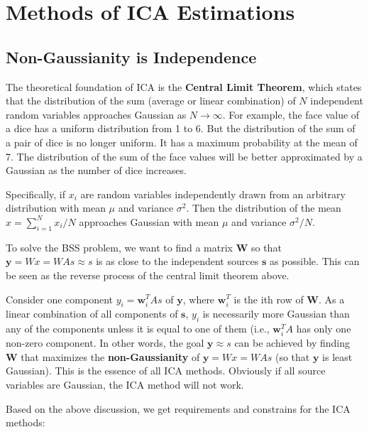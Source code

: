 \documentclass[12pt, a4paper, onecolumn]{IEEEtran}
\begin{document}
\section{Methods of ICA Estimations}

\subsection*{Non-Gaussianity is Independence}

The theoretical foundation of ICA is the
\textbf{Central Limit Theorem},
which states that the distribution of the sum (average or linear
combination) of $N$ independent random variables approaches Gaussian
as $N\rightarrow \infty$. For example, the face value of a dice has a
uniform distribution from 1 to 6. But the distribution of the sum of a
pair of dice is no longer uniform. It has a maximum probability at the
mean of 7. The distribution of the sum of the face values will be better
approximated by a Gaussian as the number of dice increases.

Specifically, if $x_i$ are random variables independently drawn from an
arbitrary distribution with mean $\mu$ and variance $\sigma^2$. Then the
distribution of the mean $x=\sum_{i=1}^N x_i/N$ approaches Gaussian with
mean $\mu$ and variance $\sigma^2/N$.

To solve the BSS problem, we want to find a matrix ${\mathbf W}$ so that
${\mathbf y=Wx=WAs \approx s}$ is as close to the independent sources
${\mathbf s}$ as possible. This can be seen as the reverse process of the
central limit theorem above.

Consider one component $y_i={\mathbf w_i^TAs}$ of ${\mathbf y}$, where
${\mathbf w_i^T}$ is the ith row of ${\mathbf W}$. As a linear combination
of all components of ${\mathbf s}$, $y_i$ is necessarily more Gaussian
than any of the components unless it is equal to one of them (i.e.,
${\mathbf w_i^TA}$ has only one non-zero component.
In other words, the goal ${\mathbf y \approx s}$ can be achieved by finding
${\mathbf W}$ that maximizes the {\bf non-Gaussianity} of
${\mathbf y=Wx=WAs}$ (so that ${\mathbf y}$ is least Gaussian). This is
the essence of all ICA methods. Obviously if all source variables are
Gaussian, the ICA method will not work.

Based on the above discussion, we get requirements and constrains for the
ICA methods:
\end{document}
